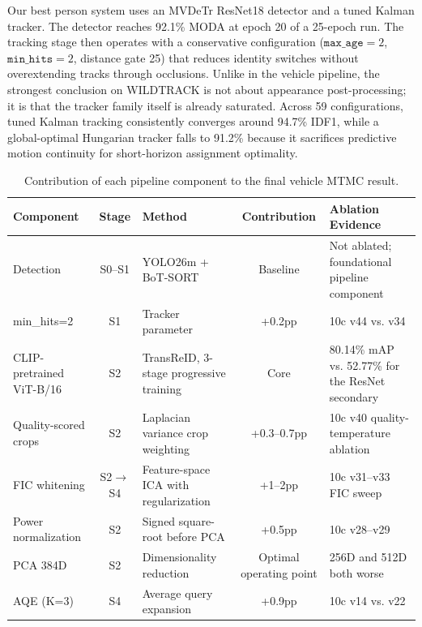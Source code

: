 \documentclass{ieeeaccess}
\begin{document}
Our best person system uses an MVDeTr ResNet18 detector and a tuned Kalman tracker. The detector reaches 92.1\% MODA at epoch 20 of a 25-epoch run. The tracking stage then operates with a conservative configuration ($\texttt{max\_age}=2$, $\texttt{min\_hits}=2$, distance gate 25) that reduces identity switches without overextending tracks through occlusions. Unlike in the vehicle pipeline, the strongest conclusion on WILDTRACK is not about appearance post-processing; it is that the tracker family itself is already saturated. Across 59 configurations, tuned Kalman tracking consistently converges around 94.7\% IDF1, while a global-optimal Hungarian tracker falls to 91.2\% because it sacrifices predictive motion continuity for short-horizon assignment optimality.

\begin{table}[t]
\centering
\caption{Contribution of each pipeline component to the final vehicle MTMC result.}
\label{tab:component_contributions}
\begingroup
\scriptsize
\setlength{\tabcolsep}{4pt}
\begin{tabularx}{\textwidth}{l c l c l}
\toprule
Component & Stage & Method & Contribution & Ablation Evidence \\
\midrule
Detection & S0--S1 & YOLO26m + BoT-SORT & Baseline & Not ablated; foundational pipeline component \\

min\_hits=2 & S1 & Tracker parameter & +0.2pp & 10c v44 vs. v34 \\

CLIP-pretrained ViT-B/16 & S2 & TransReID, 3-stage progressive training & Core & 80.14\% mAP vs. 52.77\% for the ResNet secondary \\

Quality-scored crops & S2 & Laplacian variance crop weighting & +0.3--0.7pp & 10c v40 quality-temperature ablation \\

FIC whitening & S2$\rightarrow$S4 & Feature-space ICA with regularization & +1--2pp & 10c v31--v33 FIC sweep \\

Power normalization & S2 & Signed square-root before PCA & +0.5pp & 10c v28--v29 \\

PCA 384D & S2 & Dimensionality reduction & Optimal operating point & 256D and 512D both worse \\

AQE (K=3) & S4 & Average query expansion & +0.9pp & 10c v14 vs. v22 \\


\end{tabularx}
\end{table}
\end{document}
